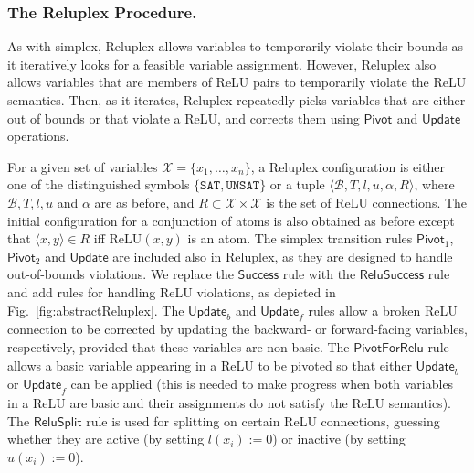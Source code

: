 \documentclass[a4paper]{llncs}
\newcommand{\relu}{\text{ReLU}\xspace{}}
\newcommand{\basic}{\mathcal{B}}
\newcommand{\allvars}{\mathcal{X}}
\newcommand{\ub}{u}
\newcommand{\lb}{l}
\newcommand{\reluSet}{R}
\newcommand{\assignment}{\alpha{}}
\newcommand{\sat}{\texttt{SAT}}
\newcommand{\unsat}{\texttt{UNSAT}}
\newcommand{\rulename}[1]{\ensuremath{\mathsf{#1}}\xspace}
\newcommand{\irulename}[2]{\ensuremath{\mathsf{#1}_{#2}}\xspace}
\newcommand{\pivot}[1]{\irulename{Pivot}{#1}}
\newcommand{\update}{\rulename{Update}}
\newcommand{\updateb}{\irulename{Update}{b}}
\newcommand{\updatef}{\irulename{Update}{f}}
\newcommand{\success}{\rulename{Success}}
\newcommand{\reluSuccess}{\rulename{ReluSuccess}}
\newcommand{\pivotForRelu}{\rulename{PivotForRelu}}
\newcommand{\reluSplit}{\rulename{ReluSplit}}
\begin{document}
\subsubsection{The Reluplex Procedure.}
As with simplex, Reluplex
 allows variables to temporarily violate their bounds
as it iteratively looks for a
feasible variable assignment. However, Reluplex also allows 
 variables that are members of ReLU pairs to temporarily
violate the ReLU semantics.
Then, as it iterates, Reluplex repeatedly picks variables that are either
 out of bounds or that violate a ReLU, and corrects them using
\pivot{} and \update{} operations.

For a given set of variables $\allvars = \{x_1,\ldots,x_n\}$,
a Reluplex configuration is either one of the distinguished symbols
$\{\sat{},\unsat{}\}$ or a tuple
$\langle \basic, T, \lb, \ub, \assignment, \reluSet \rangle$,
where $\basic, T,\lb,\ub$ and $\assignment$ are as before, and
$\reluSet\subset \allvars\times \allvars$ is the set of ReLU
connections.  The initial configuration for a conjunction of atoms
is also obtained as before except that $\langle x,y\rangle\in \reluSet$ iff
$\relu{}(x,y)$ is an atom.
The simplex transition rules 
\pivot{1}, \pivot{2} and \update{} are included also in Reluplex, as
they are designed to handle out-of-bounds violations. We replace the
\success{} rule with the \reluSuccess{} rule and add rules for
handling ReLU violations, as depicted in
Fig.~\ref{fig:abstractReluplex}. The \updateb{} and \updatef{} rules
allow a broken ReLU connection to be corrected by updating the backward- or
forward-facing variables, respectively, provided that these variables are
non-basic. The \pivotForRelu{} rule allows a basic variable appearing in a ReLU to be
pivoted so that
either \updateb{} or \updatef{} can be applied (this is needed to make progress when both variables in a ReLU are
basic and their assignments do not satisfy the ReLU semantics).
The \reluSplit{} rule is used for splitting
on certain ReLU connections, guessing whether they are
active (by setting $\lb(x_i):=0$)  or inactive (by setting
$\ub(x_i):=0$).
\end{document}
